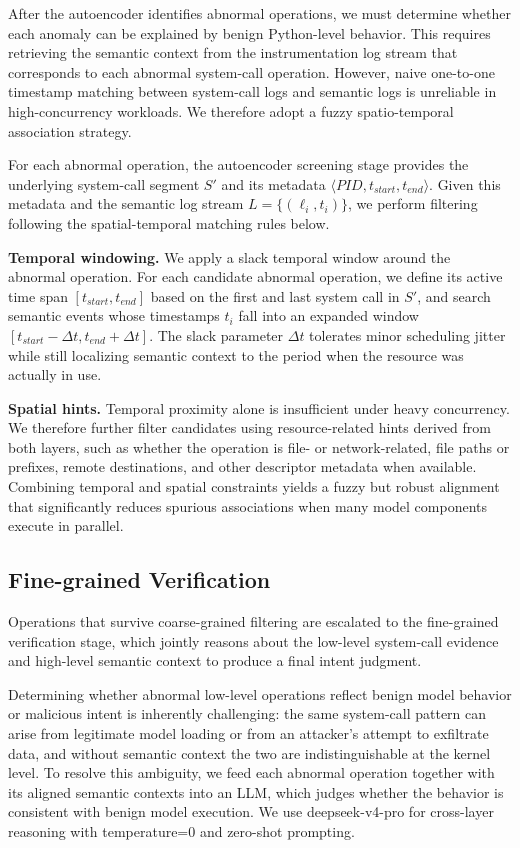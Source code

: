 After the autoencoder identifies abnormal operations, we must determine whether each anomaly can be explained by benign Python-level behavior. This requires retrieving the semantic context from the instrumentation log stream that corresponds to each abnormal system-call operation. However, naive one-to-one timestamp matching between system-call logs and semantic logs is unreliable in high-concurrency workloads. We therefore adopt a fuzzy spatio-temporal association strategy.

For each abnormal operation, the autoencoder screening stage provides the underlying system-call segment $S'$ and its metadata $\langle \textit{PID}, t_{\textit{start}}, t_{\textit{end}} \rangle$. Given this metadata and the semantic log stream $L = \{(\ell_i, t_i)\}$, we perform filtering following the spatial-temporal matching rules below.

\noindent \textbf{Temporal windowing.}
We apply a slack temporal window around the abnormal operation. For each candidate abnormal operation, we define its active time span $[t_{\textit{start}}, t_{\textit{end}}]$ based on the first and last system call in $S'$, and search semantic events whose timestamps $t_i$ fall into an expanded window $[t_{\textit{start}} - \Delta t, t_{\textit{end}} + \Delta t]$. The slack parameter $\Delta t$ tolerates minor scheduling jitter while still localizing semantic context to the period when the resource was actually in use.

\noindent \textbf{Spatial hints.}
Temporal proximity alone is insufficient under heavy concurrency. We therefore further filter candidates using resource-related hints derived from both layers, such as whether the operation is file- or network-related, file paths or prefixes, remote destinations, and other descriptor metadata when available. Combining temporal and spatial constraints yields a fuzzy but robust alignment that significantly reduces spurious associations when many model components execute in parallel.

\subsection{Fine-grained Verification}

Operations that survive coarse-grained filtering are escalated to the fine-grained verification stage, which jointly reasons about the low-level system-call evidence and high-level semantic context to produce a final intent judgment.

Determining whether abnormal low-level operations reflect benign model behavior or malicious intent is inherently challenging: the same system-call pattern can arise from legitimate model loading or from an attacker's attempt to exfiltrate data, and without semantic context the two are indistinguishable at the kernel level. To resolve this ambiguity, we feed each abnormal operation together with its aligned semantic contexts into an LLM, which judges whether the behavior is consistent with benign model execution. We use deepseek-v4-pro for cross-layer reasoning with temperature=0 and zero-shot prompting.

